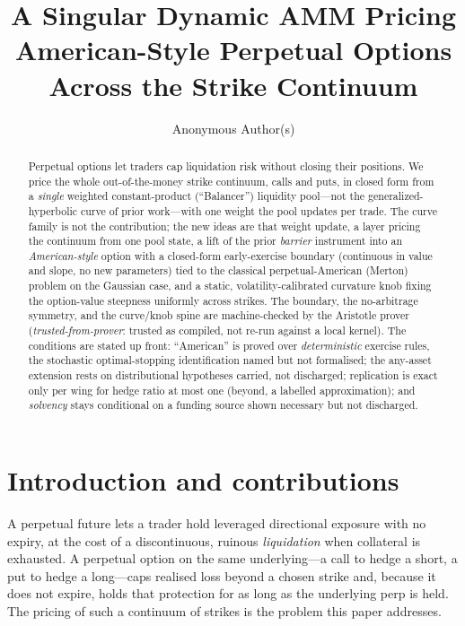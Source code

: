\documentclass[runningheads]{llncs}
\title{A Singular Dynamic AMM Pricing American-Style Perpetual Options
Across the Strike Continuum}
\author{Anonymous Author(s)}
\institute{Affiliation withheld for double-blind review}
\newcommand{\tfp}{\emph{trusted-from-prover}}
\begin{document}
\maketitle

\begin{abstract}
Perpetual options let traders cap liquidation risk without closing their
positions. We price the whole out-of-the-money strike continuum, calls and puts,
in closed form from a \emph{single} weighted constant-product (``Balancer'')
liquidity pool---not the generalized-hyperbolic curve of prior work---with one
weight the pool updates per trade. The curve family is not the contribution; the
new ideas are that weight update, a layer pricing the continuum from one pool
state, a lift of the prior \emph{barrier} instrument into an
\emph{American-style} option with a closed-form early-exercise boundary
(continuous in value and slope, no new parameters) tied to the classical
perpetual-American (Merton) problem on the Gaussian case, and a static,
volatility-calibrated curvature knob fixing the option-value steepness uniformly
across strikes. The boundary, the no-arbitrage symmetry, and the curve/knob spine
are machine-checked by the Aristotle prover (\tfp{}: trusted as compiled, not
re-run against a local kernel). The conditions are stated up front:
``American'' is proved over \emph{deterministic} exercise rules, the stochastic
optimal-stopping identification named but not formalised; the any-asset extension
rests on distributional hypotheses carried, not discharged; replication is
exact only per wing for hedge ratio at most one (beyond, a labelled
approximation); and \emph{solvency} stays conditional on a funding source shown
necessary but not discharged.

\end{abstract}


\section{Introduction and contributions}

A perpetual future lets a trader hold leveraged directional exposure with no
expiry, at the cost of a discontinuous, ruinous \emph{liquidation} when
collateral is exhausted. A perpetual option on the same underlying---a call to
hedge a short, a put to hedge a long---caps realised loss beyond a chosen strike
and, because it does not expire, holds that protection for as long as the
underlying perp is held. The pricing of such a continuum of strikes is the
problem this paper addresses.
\end{document}
